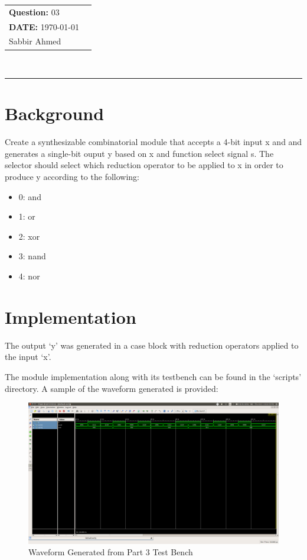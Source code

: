 \documentclass[paper=usletter, fontsize=12pt]{article}
\newcommand{\documentinfo}[3]{
    \begin{centering}
        \parbox{2in}{
        \begin{spacing}{1}
            \begin{flushleft}
                \begin{tabular}{l l}
                    #1 \\
                    #2 \\
                    #3 \\
                \end{tabular}\\
                \rule{\textwidth}{1pt}
            \end{flushleft}
        \end{spacing}
        }
    \end{centering}
}
\begin{document}
    \documentinfo{\textbf{Question:} 03}{\textbf{DATE:} \today}{Sabbir Ahmed}
    \vspace{-0.1in}

    \section{Background}
    Create a synthesizable combinatorial module that accepts a 4-bit input x and and generates a single-bit ouput y based on x and function select signal s. The selector should select which reduction operator to be applied to x in order to produce y according to the following:

    \begin{itemize}
        \item 0: and
        \item 1: or
        \item 2: xor
        \item 3: nand
        \item 4: nor
    \end{itemize}

    \section{Implementation}
    The output `y' was generated in a case block with reduction operators applied to the input `x'.

    The module implementation along with its testbench can be found in the `scripts' directory. A sample of the waveform generated is provided:

    \begin{figure}[ht]
        \begin{center}
            \includegraphics[width=1\textwidth]{wav.png}
            \caption{Waveform Generated from Part 3 Test Bench} \label{fig:wav}
        \end{center}
    \end{figure}
\end{document}
